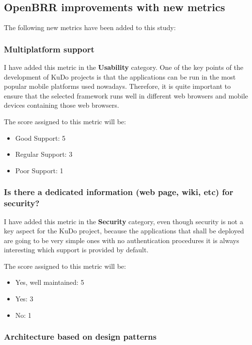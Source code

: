 \documentclass[a4paper,12pt]{book}
\begin{document}
\subsection{OpenBRR improvements with new metrics}
\label{OpenBRR improvements with new metrics}

The following new metrics have been added to this study:

\subsubsection{Multiplatform support}
\label{Multiplatform support}

I have added this metric in the \textbf{Usability} category. One of the key points of the development of KuDo projects is that the applications can be run in the most popular mobile platforms used nowadays. Therefore, it is quite important to ensure that the selected framework runs well in different web browsers and mobile devices containing those web browsers.

The score assigned to this metric will be:
\begin{itemize}
 \item Good Support: 5
 \item Regular Support: 3
 \item Poor Support: 1
\end{itemize}

\subsubsection{Is there a dedicated information (web page, wiki, etc) for security?}
\label{Is there a dedicated information (web page, wiki, etc) for security?}

I have added this metric in the \textbf{Security} category, even though security is not a key aspect for the KuDo project, because the applications that shall be deployed are going to be very simple ones with no authentication procedures it is always interesting which support is provided by default.

The score assigned to this metric will be:
\begin{itemize}
 \item Yes, well maintained: 5
 \item Yes: 3
 \item No: 1
\end{itemize}

\subsubsection{Architecture based on design patterns}
\label{Architecture based on design patterns}
\end{document}
